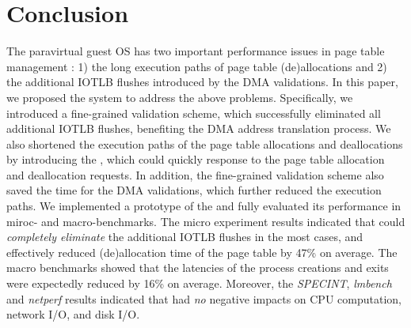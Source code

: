 \section{Conclusion} \label{sec:con}
The paravirtual guest OS has two important performance issues in page table management : 1) the long execution paths of page table (de)allocations and 2) the additional IOTLB flushes introduced by the DMA validations.
In this paper, we proposed the \name system to address the above problems.
Specifically, we introduced a fine-grained validation scheme, which successfully eliminated all additional IOTLB flushes, benefiting the DMA address translation process.
We also shortened the execution paths of the page table allocations and deallocations by introducing the \cache, which could quickly response to the page table allocation and deallocation requests.
In addition, the fine-grained validation scheme also saved the time for the DMA validations, which further reduced the execution paths.
We implemented a prototype of the \name and fully evaluated its performance in miroc- and macro-benchmarks.
The micro experiment results indicated that \name could \emph{completely eliminate} the additional IOTLB flushes in the most cases, and effectively reduced (de)allocation time of the page table by 47\% on average.
The macro benchmarks showed that the latencies of the process creations and exits were expectedly reduced by 16\% on average.
Moreover, the \emph{SPECINT}, \emph{lmbench} and \emph{netperf} results indicated that \name had \emph{no} negative impacts on CPU computation, network I/O, and disk I/O.
